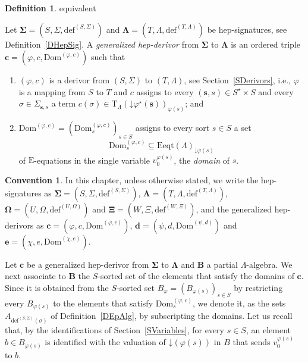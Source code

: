 \documentclass[a4paper, reqno]{amsbook}
\makeatletter
\newcommand{\vs}[1]{\mathbin{\downarrow}#1}
\newcommand{\sig}[1]{\mathbf{#1}}             %
\newcommand{\Dom}{\mathrm{Dom}}
\theoremstyle{plain}
\theoremstyle{definition}
\newtheorem{definition}[theorem]{Definition}
\newtheorem*{convention}{Convention}
\newcommand*{\CA@leanpending}{}
\newcommand*{\CA@leanrelation}{}
\newcommand*{\lean}[2]{%
  \ifcsname\string\color@lean@#1\endcsname\else
    \PackageError{main}{Unknown relation `#1' in \string\lean}{Use equivalent, weaker or stronger.}%
  \fi
  \gdef\CA@leanrelation{#1}%
  \gdef\CA@leanpending{#2}}
\makeatother
\begin{document}
\begin{definition}\label{DGenHepDerivor}\lean{equivalent}{GeneralizedHepDerivor}
Let $\sig{\Sigma}=(S,\Sigma,\mathrm{def}^{(S,\Sigma)})$ and $\sig{\Lambda}=(T,\Lambda,\mathrm{def}^{(T,\Lambda)})$ be hep-signatures, see Definition~\ref{DHepSig}.
A \emph{generalized hep-derivor} from $\sig{\Sigma}$ to $\sig{\Lambda}$ is an ordered triple $\mathbf{c}=(\varphi,c,\Dom^{(\varphi,c)})$ such that
\begin{enumerate}
\item $(\varphi,c)$ is a derivor from $(S,\Sigma)$ to $(T,\Lambda)$, see Section~\ref{SDerivors}, i.e., $\varphi$ is a mapping from $S$ to $T$ and $c$ assigns to every $(\mathbf{s},s)\in S^{\star}\times S$ and every $\sigma\in\Sigma_{\mathbf{s},s}$ a term $c(\sigma)\in\mathrm{T}_{\Lambda}(\vs{\varphi^{\star}(\mathbf{s})})_{\varphi(s)}$; and
\item $\Dom^{(\varphi,c)}=(\Dom^{(\varphi,c)}_{s})_{s\in S}$ assigns to every sort $s\in S$ a set
$$
\Dom^{(\varphi,c)}_{s}\subseteq\mathrm{Eeqt}(\Lambda)_{\vs{\varphi(s)}}
$$
of $\mathrm{E}$-equations in the single variable $v^{\varphi(s)}_{0}$, the \emph{domain} of $s$.
\end{enumerate}
\end{definition}

\begin{convention}
In this chapter, unless otherwise stated, we write the hep-signatures as $\sig{\Sigma}=(S,\Sigma,\mathrm{def}^{(S,\Sigma)})$, $\sig{\Lambda}=(T,\Lambda,\mathrm{def}^{(T,\Lambda)})$, $\sig{\Omega}=(U,\Omega,\mathrm{def}^{(U,\Omega)})$ and $\sig{\Xi}=(W,\Xi,\mathrm{def}^{(W,\Xi)})$, and the generalized hep-derivors as $\mathbf{c}=(\varphi,c,\Dom^{(\varphi,c)})$, $\mathbf{d}=(\psi,d,\Dom^{(\psi,d)})$ and $\mathbf{e}=(\chi,e,\Dom^{(\chi,e)})$.
\end{convention}

Let $\mathbf{c}$ be a generalized hep-derivor from $\sig{\Sigma}$ to $\sig{\Lambda}$ and $\mathbf{B}$ a partial $\Lambda$-algebra.
We next associate to $\mathbf{B}$ the $S$-sorted set of the elements that satisfy the domains of $\mathbf{c}$.
Since it is obtained from the $S$-sorted set $B_{\varphi}=(B_{\varphi(s)})_{s\in S}$ by restricting every $B_{\varphi(s)}$ to the elements that satisfy $\Dom^{(\varphi,c)}_{s}$, we denote it, as the sets $A_{\mathrm{def}^{(S,\Sigma)}(\sigma)}$ of Definition~\ref{DEpAlg}, by subscripting the domains.
Let us recall that, by the identifications of Section~\ref{SVariables}, for every $s\in S$, an element $b\in B_{\varphi(s)}$ is identified with the valuation of $\vs{(\varphi(s))}$ in $B$ that sends $v^{\varphi(s)}_{0}$ to $b$.
\end{document}
